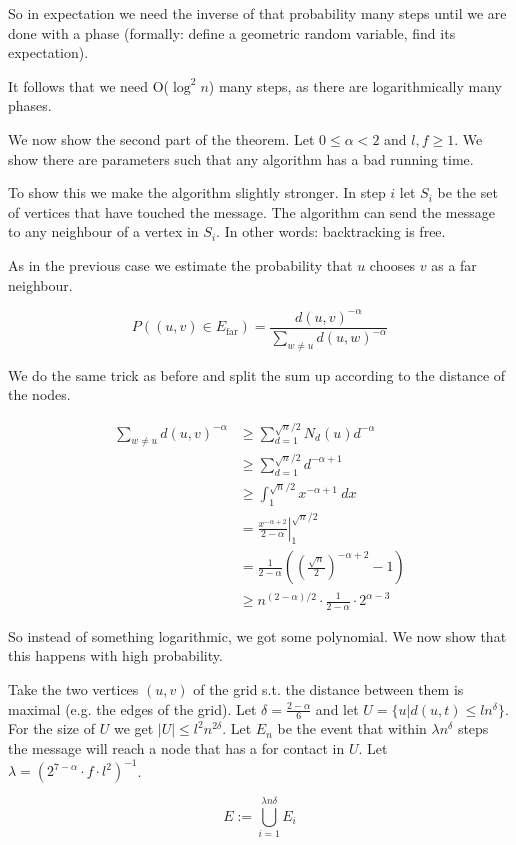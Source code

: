\begin{pr}
So in expectation we need the inverse of that probability many steps until we are done with a phase (formally: define a geometric random variable, find its expectation).

It follows that we need O($\log^2n$) many steps, as there are logarithmically many phases.

We now show the second part of the theorem. Let $0\leq \alpha < 2$ and $l,f\geq 1$. We show there are parameters such that any algorithm has a bad running time.

To show this we make the algorithm slightly stronger. In step $i$ let $S_i$ be the set of vertices that have touched the message. The algorithm can send the message to any neighbour of a vertex in $S_i$. In other words: backtracking is free.

As in the previous case we estimate the probability that $u$ chooses $v$ as a far neighbour.

\[P((u,v)\in E_{\text{far}}) = \frac{d(u,v)^{-\alpha}}{\sum_{w\neq u}d(u,w)^{-\alpha}}\]

We do the same trick as before and split the sum up according to the distance of the nodes.

\begin{align*}
\sum_{w\neq u} d(u,v)^{-\alpha} &\geq \sum_{d=1}^{\sqrt{n}/2} N_d(u)d^{-\alpha}\\
	&\geq \sum_{d=1}^{\sqrt n/2} d^{-\alpha +1}\\
	&\geq \int_1^{\sqrt{n}/2} x^{-\alpha+1}\ dx\\
	&=\left. \frac{x^{-\alpha +2}}{2-\alpha}\right|_1^{\sqrt{n}/2}\\
	&=\frac{1}{2-\alpha} ((\frac{\sqrt n}{2})^{-\alpha +2} -1)\\
	&\geq n^{(2-\alpha)/2} \cdot \frac{1}{2-\alpha} \cdot 2^{\alpha-3}
\end{align*}

So instead of something logarithmic, we got some polynomial. We now show that this happens with high probability.

Take the two vertices $(u,v)$ of the grid s.t. the distance between them is maximal (e.g. the edges of the grid). Let $\delta = \frac{2-\alpha}{6}$ and let $U=\{u|d(u,t) \leq ln^\delta\}$. For the size of $U$ we get $|U| \leq l^2n^{2\delta}$. Let $E_n$ be the event that within $\lambda n^\delta$ steps the message will reach a node that has a for contact in $U$. Let $\lambda = (2^{7-\alpha} \cdot f \cdot l^2)^{-1}$. 

\[E:= \bigcup _{i=1}^{\lambda n\delta} E_i\]


\end{pr}
